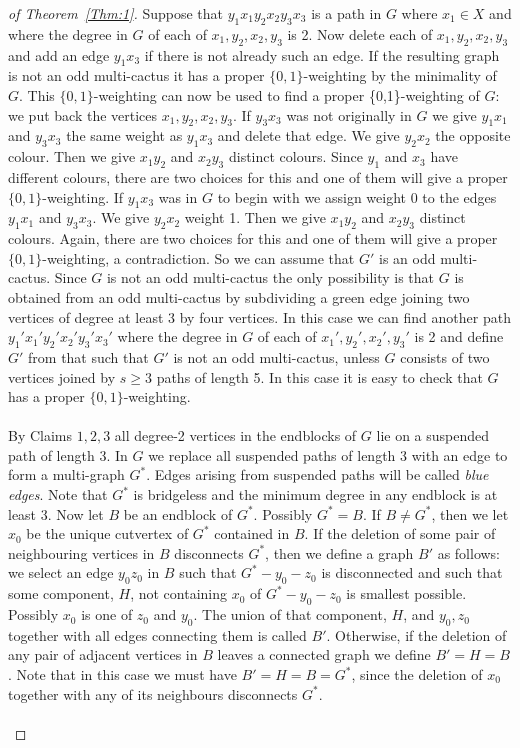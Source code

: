 \documentclass[
final,
 nomarks,
]{dmtcs-episciences}
\theoremstyle{definition}
\begin{document}
\begin{proof}[of Theorem~\ref{Thm:1}]
Suppose that $y_1x_1y_2x_2y_3x_3$ is a path in $G$ where $x_1 \in X$ and where the degree in $G$ of each of $x_1, y_2, x_2,y_3$ is 2. Now delete each of $x_1, y_2, x_2,y_3$ and add an edge $y_1x_3$ if there is not already such an edge. If the resulting graph is not an odd multi-cactus it has a proper $\{0,1\}$-weighting by the minimality of $G$. This $\{0,1\}$-weighting can now be used to find a proper \{0,1\}-weighting of $G$: we put back the vertices $x_1, y_2, x_2,y_3$. If $y_3x_3$ was not originally in $G$ we give $y_1x_1$ and $y_3x_3$ the same weight as $y_1x_3$ and delete that edge. We give $y_2x_2$ the opposite colour. Then we give $x_1y_2$ and $x_2y_3$ distinct colours. Since $y_1$ and $x_3$ have different colours, there are two choices for this and one of them will give a proper $\{0,1\}$-weighting. If $y_1x_3$ was in $G$ to begin with we assign weight 0 to the edges $y_1x_1$ and $y_3x_3$. We give $y_2x_2$ weight 1. Then we give $x_1y_2$ and $x_2y_3$ distinct colours. Again, there are two choices for this and one of them will give a proper $\{0,1\}$-weighting, a contradiction. So we can assume that $G'$ is an odd multi-cactus. Since $G$ is not an odd multi-cactus the only possibility is that $G$ is obtained from an odd multi-cactus by subdividing a green edge joining two vertices of degree at least 3 by four vertices. In this case we can find another path $y_1'x_1'y_2'x_2'y_3'x_3'$ where the degree in $G$ of each of $x_1', y_2', x_2',y_3'$ is 2 and define $G'$ from that such that $G'$ is not an odd multi-cactus, unless $G$ consists of two vertices joined by $s \geq 3$ paths of length 5. In this case it is easy to check that $G$ has a proper $\{0,1\}$-weighting. \\ \\
By Claims $1,2,3$ all degree-2 vertices in the endblocks of $G$ lie on a suspended path of length 3. In $G$ we replace all suspended paths of length 3 with an edge to form a multi-graph $G^*$. Edges arising from suspended paths will be called \emph{blue edges}. Note that $G^*$ is bridgeless and the minimum degree in any endblock is at least 3. Now let $B$ be an endblock of $G^*$. Possibly $G^*=B$. If $B \neq G^*$, then we let $x_0$ be the unique cutvertex of $G^*$ contained in $B$. If the deletion of some pair of neighbouring vertices in $B$ disconnects $G^*$, then we define a graph $B'$ as follows: we select an edge $y_0z_0$ in $B$ such that $G^*-y_0-z_0$ is disconnected and such that some component, $H$, not containing $x_0$ of $G^*-y_0-z_0$ is smallest possible. Possibly $x_0$ is one of $z_0$ and $y_0$. The union of that component, $H$, and $y_0, z_0$ together with all edges connecting them is called $B'$. Otherwise, if the deletion of any pair of adjacent vertices in $B$ leaves a connected graph we define $B'=H=B$. Note that in this case we must have $B'=H=B=G^*$, since the deletion of $x_0$ together with any of its neighbours disconnects $G^*$.  \\ \\

\end{proof}
\end{document}
